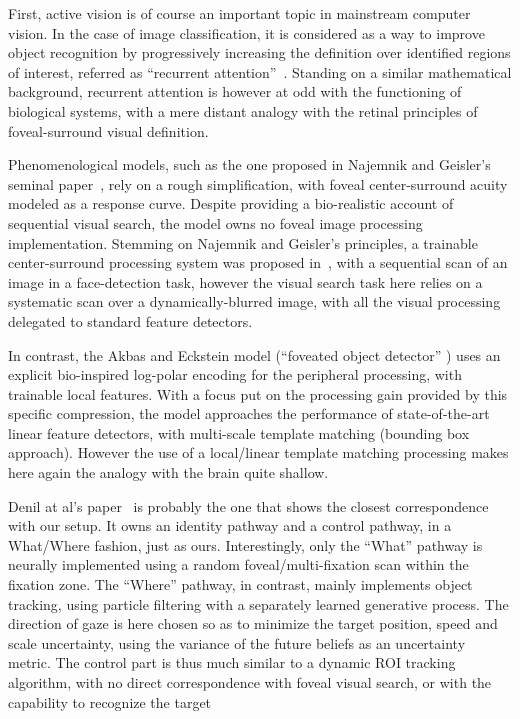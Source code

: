 First, active vision is of course an important topic in mainstream computer vision. In the case of image classification, it is considered as a way to improve object recognition by progressively increasing the definition over identified regions of interest, referred as ``recurrent attention''~\cite{mnih2014recurrent,fu2017look}.
Standing on a similar mathematical background, recurrent attention is however at odd with the functioning of biological systems, with a mere distant analogy with the retinal principles of foveal-surround visual definition.

Phenomenological models, such as the one proposed in Najemnik and Geisler's seminal paper~\cite{Najemnik05}, rely on a rough simplification, with foveal center-surround acuity modeled as a response curve. Despite providing a bio-realistic account of sequential visual search, the model owns no foveal image processing implementation. Stemming on Najemnik and Geisler's principles, a trainable center-surround processing system was proposed in~\cite{Butko2010infomax}, with a sequential scan of an image in a face-detection task, however the visual search task here relies on a systematic scan over a  dynamically-blurred image, with all the visual processing delegated to standard feature detectors.

In contrast, the Akbas and Eckstein model (“foveated object detector” \cite{akbas2017object}) uses an explicit bio-inspired log-polar encoding 
for the peripheral processing, with trainable local features.
With a focus put on the processing gain provided by this specific compression,
the model approaches the performance of state-of-the-art linear feature detectors, with  multi-scale template matching (bounding box approach). However the use of
a local/linear template matching processing makes here again the analogy with the brain quite shallow. 
 

Denil at al's paper~\cite{denil2012learning} is probably the one that shows the closest correspondence with our setup. It owns an identity pathway and a control pathway, in a What/Where fashion, just as ours. Interestingly, only the ``What'' pathway is neurally implemented using a random foveal/multi-fixation scan within the fixation zone. The ``Where'' pathway, in contrast, mainly implements object tracking, using  particle filtering with a separately learned generative process. The direction of gaze is here chosen so as to minimize the target position, speed and scale uncertainty, using the variance of the future beliefs as an uncertainty metric. The control part is thus much similar to a dynamic ROI tracking algorithm, with no direct correspondence with foveal visual search, or with the capability to recognize the target

